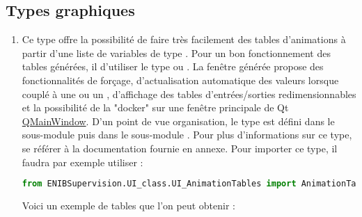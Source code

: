 {\begin{enumerate}
\end{enumerate}



\newpage



\subsection{Types graphiques}

\begin{enumerate}

\item {}\newline
Ce type offre la possibilité de faire très facilement des tables d'animations à partir d'une liste de variables de type . Pour un bon fonctionnement des tables générées, il  d'utiliser le type  ou .\newline
La fenêtre générée propose des fonctionnalités de forçage, d'actualisation automatique des valeurs lorsque couplé à une  ou un , d'affichage des tables d'entrées/sorties redimensionnables et la possibilité de la "docker" sur une fenêtre principale de Qt \href{https://doc.qt.io/qt-5/qmainwindow.html}{QMainWindow}.\newline
D'un point de vue organisation, le type  est défini dans le sous-module  puis dans le sous-module \newline {}.\newline
Pour plus d'informations sur ce type, se référer à la documentation fournie en annexe.\newline
Pour importer ce type, il faudra par exemple utiliser :
\begin{lstlisting}[language=Python]
from ENIBSupervision.UI_class.UI_AnimationTables import AnimationTables
\end{lstlisting}
Voici un exemple de tables que l'on peut obtenir :



\end{enumerate}}

